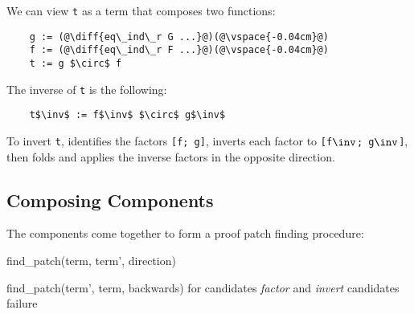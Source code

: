 We can view \lstinline{t} as a term that composes two functions:

\begin{lstlisting}
    g := (@\diff{eq\_ind\_r G ...}@)(@\vspace{-0.04cm}@)
    f := (@\diff{eq\_ind\_r F ...}@)(@\vspace{-0.04cm}@)
    t := g $\circ$ f
\end{lstlisting}

The inverse of \lstinline{t} is the following:

\begin{lstlisting}
    t$\inv$ := f$\inv$ $\circ$ g$\inv$
\end{lstlisting}

To invert \lstinline{t}, \sysname identifies the factors \lstinline{[f; g]}, 
inverts each factor to \lstinline{[f}$\inv$\lstinline{; g}$\inv$\lstinline{]}, 
then folds and applies the inverse factors in the opposite direction.

\subsection{Composing Components}
\label{sec:composeintro}


The components come together to form a proof patch finding procedure:

\begin{algorithm}
\begin{algorithmic}[1]
\renewcommand{\thealgorithm}{}
\footnotesize
\caption{\footnotesize{find\_patch(term, term', direction)}}
    \STATE {}
    \STATE {}
      \STATE {}
    \ENDIF
      \STATE find\_patch(term', term, backwards) for candidates
      \STATE \textit{factor} and \textit{invert} candidates
    \ENDIF
    \RETURN failure
\end{algorithmic}
\label{alg:patching}	
\end{algorithm}

